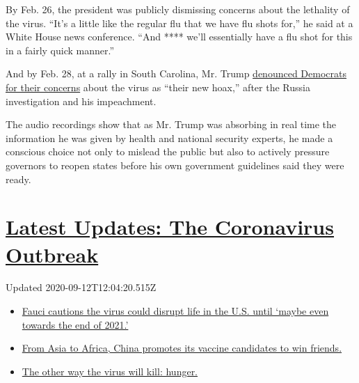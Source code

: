 By Feb. 26, the president was publicly dismissing concerns about the
lethality of the virus. ``It's a little like the regular flu that we
have flu shots for,'' he said at a White House news conference. ``And
**** we'll essentially have a flu shot for this in a fairly quick
manner.''

And by Feb. 28, at a rally in South Carolina, Mr. Trump
\href{https://www.nytimes3xbfgragh.onion/2020/02/28/us/politics/trump-accuses-media-democrats-coronavirus.html}{denounced
Democrats for their concerns} about the virus as ``their new hoax,''
after the Russia investigation and his impeachment.

The audio recordings show that as Mr. Trump was absorbing in real time
the information he was given by health and national security experts, he
made a conscious choice not only to mislead the public but also to
actively pressure governors to reopen states before his own government
guidelines said they were ready.

\hypertarget{latest-updates-the-coronavirus-outbreak}{%
\section{\texorpdfstring{\href{https://www.nytimes3xbfgragh.onion/2020/09/11/world/covid-19-coronavirus.html?action=click\&pgtype=Article\&state=default\&region=MAIN_CONTENT_1\&context=storylines_live_updates}{Latest
Updates: The Coronavirus
Outbreak}}{Latest Updates: The Coronavirus Outbreak}}\label{latest-updates-the-coronavirus-outbreak}}

Updated 2020-09-12T12:04:20.515Z

\begin{itemize}
\tightlist
\item
  \href{https://www.nytimes3xbfgragh.onion/2020/09/11/world/covid-19-coronavirus.html?action=click\&pgtype=Article\&state=default\&region=MAIN_CONTENT_1\&context=storylines_live_updates\#link-dfb8a16}{Fauci
  cautions the virus could disrupt life in the U.S. until `maybe even
  towards the end of 2021.'}
\item
  \href{https://www.nytimes3xbfgragh.onion/2020/09/11/world/covid-19-coronavirus.html?action=click\&pgtype=Article\&state=default\&region=MAIN_CONTENT_1\&context=storylines_live_updates\#link-7104d154}{From
  Asia to Africa, China promotes its vaccine candidates to win friends.}
\item
  \href{https://www.nytimes3xbfgragh.onion/2020/09/11/world/covid-19-coronavirus.html?action=click\&pgtype=Article\&state=default\&region=MAIN_CONTENT_1\&context=storylines_live_updates\#link-393ad215}{The
  other way the virus will kill: hunger.}
\end{itemize}

